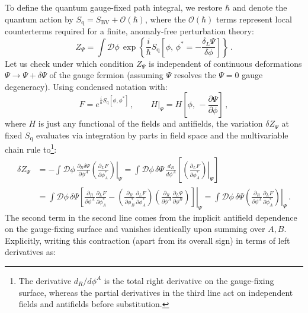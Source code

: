 To define the quantum gauge-fixed path integral, we restore \(\hbar\) and denote the quantum action by \(S_{\text{q}} = S_{\text{BV}} + \mathcal{O}(\hbar)\), where the \(\mathcal{O}(\hbar)\) terms represent local counterterms required for a finite, anomaly-free perturbation theory:
\begin{equation} \label{eq:bv_gauge_fixed_path_integral}
    Z_\Psi = \int \mathcal{D}\phi \, \exp\left\{ \frac{i}{\hbar} S_{\text{q}}\left[ \phi, \, \phi^* = -\frac{\delta_L \Psi}{\delta \phi} \right] \right\} \, .
\end{equation}
Let us check under which condition \(Z_\Psi\) is independent of continuous deformations \(\Psi \rightarrow \Psi + \delta\Psi\) of the gauge fermion (assuming \(\Psi\) resolves the \(\Psi=0\) gauge degeneracy). Using condensed notation with:
\[
    F = e^{\frac{i}{\hbar} S_{\text{q}}[\phi, \phi^*]} \, , \qquad \left. H \right|_\Psi = H\left[ \phi, \, -\frac{\partial \Psi}{\partial \phi} \right] \, ,
\]
where \(H\) is just any functional of the fields and antifields, the variation \(\delta Z_\Psi\) at fixed \(S_{\text{q}}\) evaluates via integration by parts in field space and the multivariable chain rule to\footnote{The derivative \(d_R / d\phi^A\) is the total right derivative on the gauge-fixing surface, whereas the partial derivatives in the third line act on independent fields and antifields before substitution.}:
\[
    \begin{aligned}
        \delta Z_\Psi & = -\int \mathcal{D}\phi \, \frac{\partial_R \delta\Psi}{\partial \phi^A} \left. \left( \frac{\partial_L F}{\partial \phi_A^*} \right) \right|_\Psi = \int \mathcal{D}\phi \, \delta\Psi \, \frac{d_R}{d\phi^A} \left[ \left. \left( \frac{\partial_L F}{\partial \phi_A^*} \right) \right|_\Psi \right]                                                                                                                                                                                         \\
                      & = \int \mathcal{D}\phi \, \delta\Psi \left. \left[ \frac{\partial_R}{\partial \phi^A} \frac{\partial_L F}{\partial \phi_A^*} - \left( \frac{\partial_R}{\partial \phi_B^*} \frac{\partial_L F}{\partial \phi_A^*} \right) \left( \frac{\partial_R}{\partial \phi^A} \frac{\partial_L \Psi}{\partial \phi^B} \right) \right] \right|_\Psi = \int \mathcal{D}\phi \, \delta\Psi \left. \left( \frac{\partial_R}{\partial \phi^A} \frac{\partial_L F}{\partial \phi_A^*} \right) \right|_\Psi \, .
    \end{aligned}
\]
The second term in the second line comes from the implicit antifield dependence on the gauge-fixing surface and vanishes identically upon summing over \(A, B\). Explicitly, writing this contraction (apart from its overall sign) in terms of left derivatives as:
